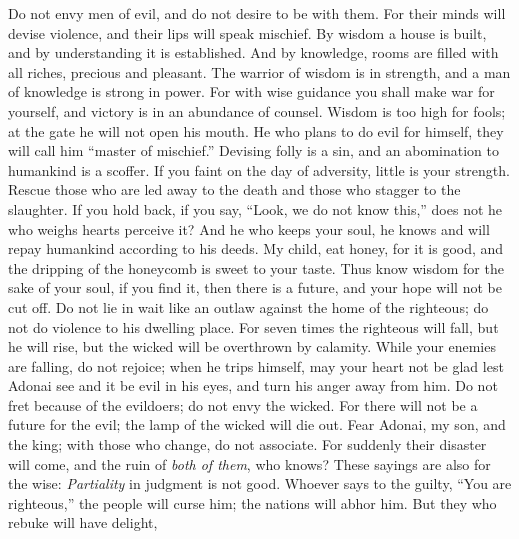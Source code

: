 \begin{biblechapter} %
\verse Do not envy men of evil, 
and do not desire to be with them.
\verse For their minds will devise violence, 
and their lips will speak mischief.
\verse By wisdom a house is built, 
and by understanding it is established.
\verse And by knowledge, rooms are filled 
with all riches, precious and pleasant.
\verse The warrior of wisdom is in strength, 
and a man of knowledge is strong in power.
\verse For with wise guidance you shall make war for yourself, 
and victory is in an abundance of counsel.
\verse Wisdom is too high for fools; 
at the gate he will not open his mouth.
\verse He who plans to do evil for himself, 
they will call him “master of mischief.”
\verse Devising folly is a sin, 
and an abomination to humankind is a scoffer.
\verse If you faint on the day of adversity, 
little is your strength.
\verse Rescue those who are led away to the death 
and those who stagger to the slaughter. If you hold back,
\verse if you say, “Look, we do not know this,” 
does not he who weighs hearts perceive it? 
And he who keeps your soul, 
he knows and will repay humankind according to his deeds.
\verse My child, eat honey, for it is good, 
and the dripping of the honeycomb is sweet to your taste.
\verse Thus know wisdom for the sake of your soul, 
if you find it, then there is a future, 
and your hope will not be cut off.
\verse Do not lie in wait like an outlaw against the home of the righteous; 
do not do violence to his dwelling place.
\verse For seven times the righteous will fall, but he will rise, 
but the wicked will be overthrown by calamity.
\verse While your enemies are falling, do not rejoice; 
when he trips himself, may your heart not be glad
\verse lest Adonai see and it be evil in his eyes, 
and turn his anger away from him.
\verse Do not fret because of the evildoers; 
do not envy the wicked.
\verse For there will not be a future for the evil; 
the lamp of the wicked will die out.
\verse Fear Adonai, my son, and the king; 
with those who change, do not associate.
\verse For suddenly their disaster will come, 
and the ruin of \textit{both of them}, who knows?
\verse These sayings are also for the wise: 
\textit{Partiality} in judgment is not good.
\verse Whoever says to the guilty, “You are righteous,” the people will curse him; 
the nations will abhor him.
\verse But they who rebuke will have delight, 

\end{biblechapter}
